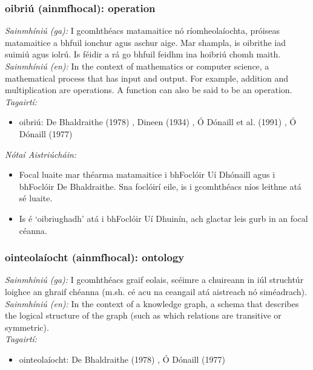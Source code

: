 \subsubsection*{oibriú (ainmfhocal): operation}
 \noindent \textit{Sainmhíniú (ga):} I gcomhthéacs matamaitice nó ríomheolaíochta, próiseas matamaitice a bhfuil ionchur agus aschur aige. Mar shampla, is oibrithe iad suimiú agus iolrú. Is féidir a rá go bhfuil feidhm ina hoibriú chomh maith.
\\
 \noindent \textit{Sainmhíniú (en):} In the context of mathematics or computer science, a mathematical process that has input and output. For example, addition and multiplication are operations. A function can also be said to be an operation.
\\
 \noindent \textit{Tagairtí:}
\begin{itemize}
	\item oibriú: De Bhaldraithe (1978) \cite{de-bhaldraithe}, Dineen (1934) \cite{dineen}, Ó Dónaill et al. (1991) \cite{focloir-beag}, Ó Dónaill (1977) \cite{odonaill}
\end{itemize}

 \noindent \textit{Nótaí Aistriúcháin:}
\begin{itemize}
	\item Focal luaite mar théarma matamaitice i bhFoclóir Uí Dhónaill agus i bhFoclóir De Bhaldraithe. Sna foclóirí eile, is i gcomhthéacs níos leithne atá sé luaite.
	\item Is é `oibriughadh' atá i bhFoclóir Uí Dhuinín, ach glactar leis gurb in an focal céanna.
\end{itemize}


\subsubsection*{ointeolaíocht (ainmfhocal): ontology}
 \noindent \textit{Sainmhíniú (ga):} I gcomhthéacs graif eolais, scéimre a chuireann in iúl struchtúr loighce an ghraif chéanna (m.sh. cé acu na ceangail atá aistreach nó siméadrach).
\\
 \noindent \textit{Sainmhíniú (en):} In the context of a knowledge graph, a schema that describes the logical structure of the graph (such as which relations are transitive or symmetric).
\\
 \noindent \textit{Tagairtí:}
\begin{itemize}
	\item ointeolaíocht: De Bhaldraithe (1978) \cite{de-bhaldraithe}, Ó Dónaill (1977) \cite{odonaill}
\end{itemize}

